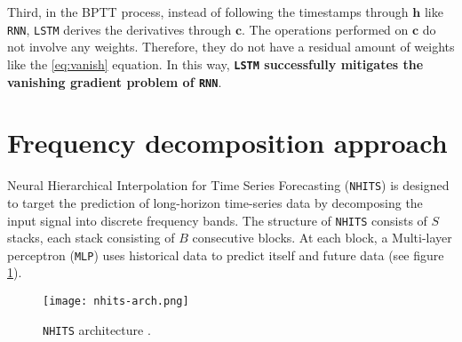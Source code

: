 Third, in the BPTT process, instead of following the timestamps through $\mathbf{h}$ like \verb|RNN|, \verb|LSTM| derives the derivatives through $\mathbf{c}$. The operations performed on $\mathbf{c}$ do not involve any weights. Therefore, they do not have a residual amount of weights like the \ref{eq:vanish} equation. In this way, \textbf{\Verb|LSTM| successfully mitigates the vanishing gradient problem of \Verb|RNN|}.

\section{Frequency decomposition approach}






Neural Hierarchical Interpolation for Time Series Forecasting (\verb|NHITS|) \cite{challu2023nhits} is designed to target the prediction of long-horizon time-series data by decomposing the input signal into discrete frequency bands. The structure of \verb|NHITS| consists of $S$ stacks, each stack consisting of $B$ consecutive blocks. At each block, a Multi-layer perceptron (\verb|MLP|) uses historical data to predict itself and future data (see figure \ref{fig:nhits}).

\begin{figure}[H]
    \centering
    \texttt{[image: nhits-arch.png]}
    \cprotect\caption{\verb|NHITS| architecture \cite{challu2023nhits}.}
    \label{fig:nhits}
\end{figure}

